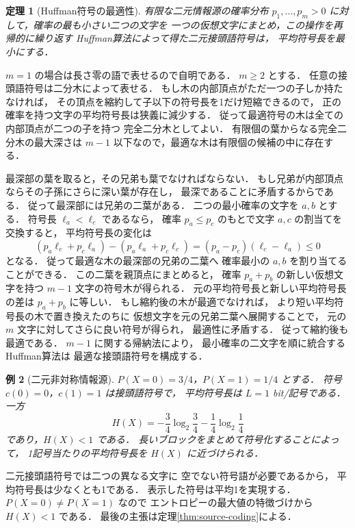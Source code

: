 \documentclass[a5paper,10pt,onecolumn]{jsarticle}
\makeatletter
\theoremstyle{mathnotetheorem}
\newtheorem{theorem}{定理}[section]
\newtheorem{example}[theorem]{例}
\renewcommand{\proofname}{証明}
\renewenvironment{proof}[1][\proofname]{%
  \par\pushQED{\qed}\normalfont\topsep4\p@\@plus2\p@\relax
  \trivlist\item[\hskip\labelsep\bfseries #1]\ignorespaces
}{\popQED\endtrivlist\@endpefalse}
\makeatother
\begin{document}
\begin{theorem}[Huffman符号の最適性]\label{thm:huffman}
有限な二元情報源の確率分布 $p_1,\dots,p_m>0$
に対して，確率の最も小さい二つの文字を
一つの仮想文字にまとめ，この操作を再帰的に繰り返す
Huffman算法によって得た二元接頭語符号は，
平均符号長を最小にする．
\end{theorem}
\begin{proof}
$ m=1$ の場合は長さ零の語で表せるので自明である．
$m\ge2$ とする．
任意の接頭語符号は二分木によって表せる．
もし木の内部頂点がただ一つの子しか持たなければ，
その頂点を縮約して子以下の符号長を1だけ短縮できるので，
正の確率を持つ文字の平均符号長は狭義に減少する．
従って最適符号の木は全ての内部頂点が二つの子を持つ
完全二分木としてよい．
有限個の葉からなる完全二分木の最大深さは
$m-1$ 以下なので，最適な木は有限個の候補の中に存在する．

最深部の葉を取ると，その兄弟も葉でなければならない．
もし兄弟が内部頂点ならその子孫にさらに深い葉が存在し，
最深であることに矛盾するからである．
従って最深部には兄弟の二葉がある．
二つの最小確率の文字を $a,b$ とする．
符号長 $\ell_a<\ell_c$ であるなら，
確率 $p_a\le p_c$ のもとで文字 $a,c$ の割当てを交換すると，
平均符号長の変化は
\[
 (p_a\ell_c+p_c\ell_a)
 -(p_a\ell_a+p_c\ell_c)
 =(p_a-p_c)(\ell_c-\ell_a)\le0
\]
となる．
従って最適な木の最深部の兄弟の二葉へ
確率最小の $a,b$ を割り当てることができる．
この二葉を親頂点にまとめると，
確率 $p_a+p_b$ の新しい仮想文字を持つ
$m-1$ 文字の符号木が得られる．
元の平均符号長と新しい平均符号長の差は
$p_a+p_b$ に等しい．
もし縮約後の木が最適でなければ，
より短い平均符号長の木で置き換えたのちに
仮想文字を元の兄弟二葉へ展開することで，
元の $m$ 文字に対してさらに良い符号が得られ，
最適性に矛盾する．
従って縮約後も最適である．
$m-1$ に関する帰納法により，
最小確率の二文字を順に統合するHuffman算法は
最適な接頭語符号を構成する．
\end{proof}

\begin{example}[二元非対称情報源]
$P(X=0)=3/4$，$P(X=1)=1/4$ とする．
符号 $c(0)=0$，$c(1)=1$ は接頭語符号で，
平均符号長は $L=1$ bit/記号である．
一方
\[
 H(X)=-\frac34\log_2\frac34
       -\frac14\log_2\frac14
\]
であり，$H(X)<1$ である．
長いブロックをまとめて符号化することによって，
1記号当たりの平均符号長を $H(X)$ に近づけられる．
\end{example}
\begin{proof}
二元接頭語符号では二つの異なる文字に
空でない符号語が必要であるから，
平均符号長は少なくとも1である．
表示した符号は平均1を実現する．
$P(X=0)\ne P(X=1)$ なので
エントロピーの最大値の特徴づけから $H(X)<1$ である．
最後の主張は定理\ref{thm:source-coding}による．
\end{proof}
\end{document}
